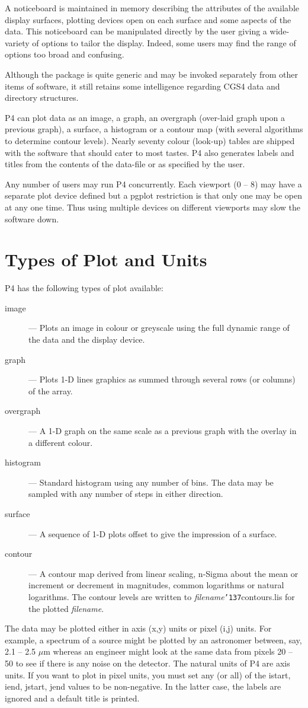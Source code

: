 \documentclass[a4paper]{book}
\renewcommand{\_}{{\tt\char'137}}
\begin{document}
A noticeboard is maintained in memory describing the attributes of the available
display surfaces, plotting devices open on each surface and some aspects of the data.
This noticeboard can be manipulated directly by the user giving a wide-variety
of options to tailor the display. Indeed, some users may find the range of
options too broad and confusing.

Although the package is quite generic and may be invoked separately from other
items of software, it still retains some intelligence regarding CGS4 data and directory structures.

P4 can plot data as an image, a graph, an overgraph (over-laid graph upon
a previous graph), a surface, a histogram or a contour map (with several
algorithms to determine contour levels). Nearly seventy colour (look-up) tables are
shipped with the software that should cater to most tastes.
P4 also generates labels and titles from the contents of the data-file or
as specified by the user.

Any number of users may run P4 concurrently. Each viewport (0 -- 8)
may have a separate plot device defined but a {\sc pgplot} restriction is that only one may be
open at any one time. Thus using multiple devices on different viewports may
slow the software down.

\section{Types of Plot and Units}
P4 has the following types of plot available:
\begin{description}
\item[{\sc image}]--- Plots an image in colour or greyscale using the full dynamic range of the data and the display device.
\item[{\sc graph}]--- Plots 1-D lines graphics as summed through several rows (or columns) of the array.
\item[{\sc overgraph}]--- A 1-D graph on the same scale as a previous graph with the overlay in a different colour.
\item[{\sc histogram}]--- Standard histogram using any number of bins. The data may be sampled with any number of steps
  in either direction.
\item[{\sc surface}]--- A sequence of 1-D plots offset to give the impression of a surface.
\item[{\sc contour}]--- A contour map derived from linear scaling, n-Sigma about the mean or increment or decrement in magnitudes,
  common logarithms or natural logarithms. The contour levels are written to {\em filename}\_contours.lis for the plotted
  {\em filename}.
\end{description}
The data may be plotted either in axis (x,y) units or pixel (i,j) units. For example, a spectrum of a source might
be plotted  by an astronomer between, say, 2.1 -- 2.5 $\mu$m whereas an engineer might look at the same data from pixels
20 -- 50 to see if there is any noise on the detector. The natural units of P4 are axis units.
If you want to plot in pixel units, you must set any (or all) of the istart, iend, jstart, jend values to be
non-negative. In the latter case, the labels are ignored and a default title is printed.
\end{document}
